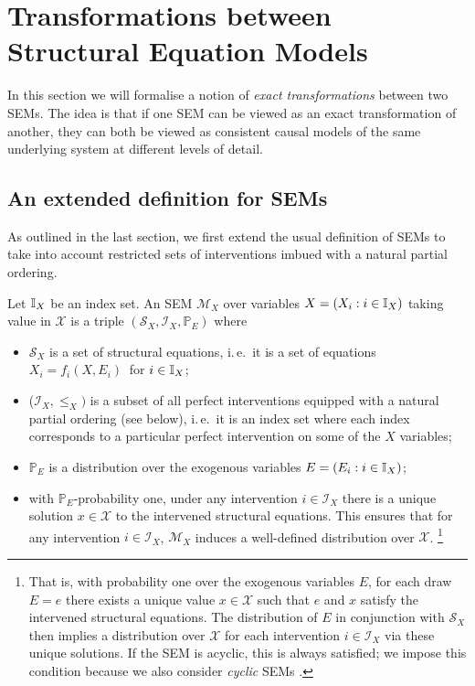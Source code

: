 \section{Transformations between Structural Equation Models}

In this section we will formalise a notion of \emph{exact transformations} between two SEMs. 
The idea is that if one SEM can be viewed as an exact transformation of another, they can both be viewed as consistent causal models of the same underlying system at different levels of detail. 


\subsection{An extended definition for SEMs}

As outlined in the last section, we first extend the usual definition of SEMs to take into account restricted sets of interventions imbued with a natural partial ordering.

\begin{definition}
	Let $\mathbb{I}_X$ be an index set.
	An SEM $\mathcal{M}_X$ over  variables ${X = (X_i : i\in\mathbb{I}_X )}$ taking value in $\mathcal{X}$ is a triple $\left(\mathcal{S}_X, \mathcal{I}_X, \mathbb{P}_{E} \right)$ where
	\begin{itemize}[noitemsep]
		\item $\mathcal{S}_X$ is a set of structural equations, i.\,e.\ it is a set of equations $X_i = f_i\left( X , E_i \right)\ $ for $i \in \mathbb{I}_X$;
		\item ($\mathcal{I}_X, \leq_X)$ is a subset of all perfect interventions equipped with a natural partial ordering (see below), i.\,e.\ it is an index set where each index corresponds to a particular perfect intervention on some of the $X$ variables;
		\item $\mathbb{P}_{E}$ is a distribution over the exogenous variables $E = ( E_i : i\in\mathbb{I}_X)$;
		\item with $\mathbb{P}_E$-probability one, under any intervention ${i \in \mathcal{I}_X}$ there is a unique solution $x\in\mathcal{X}$ to the intervened structural equations. This ensures that for any intervention ${i \in \mathcal{I}_X}$, $\mathcal{M}_X$ induces a well-defined distribution over $\mathcal{X}$.%
		\footnote{That is, with probability one over the exogenous variables $E$, for each draw $E=e$ there exists a unique value $x\in \mathcal{X}$ such that $e$ and $x$ satisfy the intervened structural equations. The distribution of $E$ in conjunction with $\mathcal{S}_X$ then implies a distribution over $\mathcal{X}$ for each intervention $i \in \mathcal{I}_X$ via these unique solutions.
			If the SEM is acyclic, this is always satisfied; we impose this condition because we also consider \emph{cyclic} SEMs \cite{bongers2016structural}.}
	\end{itemize}
\end{definition}
\medskip


